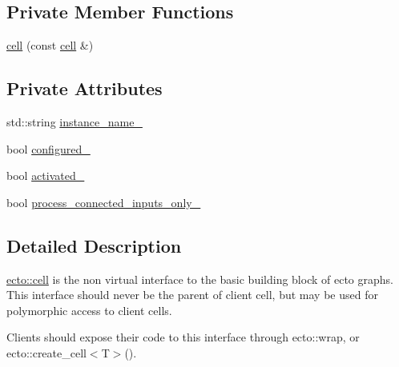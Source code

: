 \subsection*{Private Member Functions}
\begin{DoxyCompactItemize}
\item 
\hyperlink{structecto_1_1cell_ac0ae6a72cecf48916bb6dd1b6393d1b3}{cell} (const \hyperlink{structecto_1_1cell}{cell} \&)
\end{DoxyCompactItemize}
\subsection*{Private Attributes}
\begin{DoxyCompactItemize}
\item 
std\-::string \hyperlink{structecto_1_1cell_a2bf4e65c7a699624c61d3b55cfac45ed}{instance\-\_\-name\-\_\-}
\item 
bool \hyperlink{structecto_1_1cell_a187d36610ae8035e9f589de06ecc0d0a}{configured\-\_\-}
\item 
bool \hyperlink{structecto_1_1cell_ad270620c006f30471b2371feb38b6a03}{activated\-\_\-}
\item 
bool \hyperlink{structecto_1_1cell_a9a9d7fa3bb72fd74073a997bfb6cbad8}{process\-\_\-connected\-\_\-inputs\-\_\-only\-\_\-}
\end{DoxyCompactItemize}


\subsection{Detailed Description}
\hyperlink{structecto_1_1cell}{ecto\-::cell} is the non virtual interface to the basic building block of ecto graphs. This interface should never be the parent of client cell, but may be used for polymorphic access to client cells. 

Clients should expose their code to this interface through ecto\-::wrap, or ecto\-::create\-\_\-cell$<$\-T$>$().

